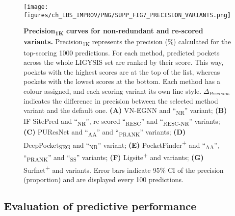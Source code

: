 \begin{figure}[ht!]
    \centering
    \texttt{[image: figures/ch\_LBS\_IMPROV/PNG/SUPP\_FIG7\_PRECISION\_VARIANTS.png]}
    \caption[Precision\textsubscript{1K} curves for non-redundant and re-scored variants]{\textbf{Precision\textsubscript{1K} curves for non-redundant and re-scored variants.}  Precision\textsubscript{1K} represents the precision (\%) calculated for the top-scoring 1000 predictions. For each method, predicted pockets across the whole LIGYSIS set are ranked by their score. This way, pockets with the highest scores are at the top of the list, whereas pockets with the lowest scores at the bottom. Each method has a colour assigned, and each scoring variant its own line style. $\Delta_{Precision}$ indicates the difference in precision between the selected method variant and the default one.  \textbf{(A)} VN-EGNN and ``\textsubscript{NR}'' variant; \textbf{(B)} IF-SitePred and ``\textsubscript{NR}'', re-scored ``\textsubscript{RESC}'' and ``\textsubscript{RESC-NR}'' variants; \textbf{(C)} PUResNet and ``\textsubscript{AA}'' and ``\textsubscript{PRANK}'' variants; \textbf{(D)} DeepPocket\textsubscript{SEG} and ``\textsubscript{NR}'' variant; \textbf{(E)} PocketFinder\textsuperscript{+} and ``\textsubscript{AA}'', ``\textsubscript{PRANK}'' and ``\textsubscript{SS}'' variants; \textbf{(F)} Ligsite\textsuperscript{+} and variants; \textbf{(G)} Surfnet\textsuperscript{+} and variants. Error bars indicate 95\% CI of the precision (proportion) and are displayed every 100 predictions.}
    \label{fig:pocket_precision_variants}
\end{figure}

\FloatBarrier

\subsection{Evaluation of predictive performance}



